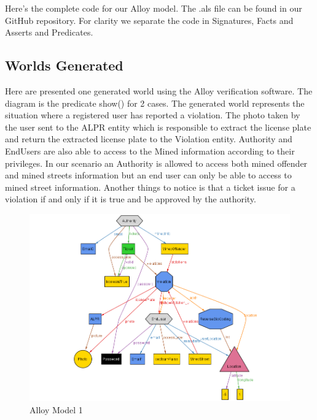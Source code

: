 Here’s the complete code for our Alloy model. The .als file can be found in our
GitHub repository. For clarity we separate the code in Signatures, Facts and
Asserts and Predicates.




\subsection{Worlds Generated}
Here are presented one generated world using the Alloy veriﬁcation software. The diagram is the predicate show() for 2 cases.
The generated world represents the situation where a registered user has reported a violation. The photo taken by the user sent to the ALPR entity which is responsible to extract the license plate and return the extracted license plate to the Violation entity. Authority and EndUsers are also able to access to the Mined information according to their privileges. In our scenario an Authority is allowed to access both mined offender and mined streets information but an end user can only be able to access to mined street information. Another things to notice is that a ticket issue for a violation if and only if it is true and be approved by the authority.

\begin{figure}[H]
		\centering
      \includegraphics[width=\textwidth]{Images/alloy.PNG}
      \caption{Alloy Model 1}   \label{fig:alloy}
\end{figure}
